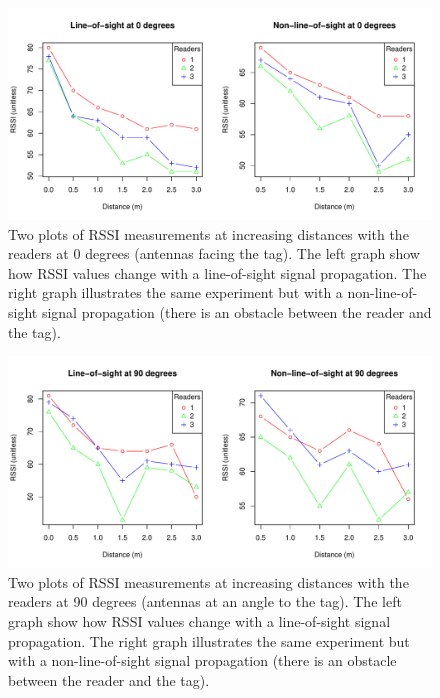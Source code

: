 \begin{figure}[H]
	\begin{center}
		\includegraphics[width=1\textwidth]{figures/rssi_distance_3m_0deg}
		\caption{Two plots of RSSI measurements at increasing distances with the readers at 0 degrees (antennas facing the tag). The left graph show how RSSI values change with a line-of-sight signal propagation. The right graph illustrates the same experiment but with a non-line-of-sight signal propagation (there is an obstacle between the reader and the tag).}
	\end{center}
\end{figure}



\begin{figure}[H]
	\begin{center}
		\includegraphics[width=1\textwidth]{figures/rssi_distance_3m_90deg}
		\caption{Two plots of RSSI measurements at increasing distances with the readers at 90 degrees (antennas at an angle to the tag). The left graph show how RSSI values change with a line-of-sight signal propagation. The right graph illustrates the same experiment but with a non-line-of-sight signal propagation (there is an obstacle between the reader and the tag).}
	\end{center}
\end{figure}


